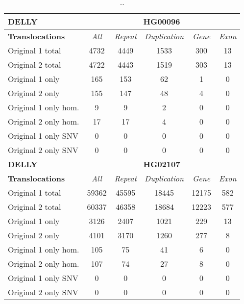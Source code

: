 \begin{table}[htb]
\begin{center}
\begin{tabular}{|l|c||c|c|c|c|}
\hline
{\bf DELLY} & \multicolumn{5}{|c|}{\bf HG00096} \\
\hline
\cline{2-6}
{\bf Translocations} & {\it All} & {\it Repeat} & {\it Duplication} & {\it Gene} & {\it Exon} \\
\hline
Original 1 total & 4732 & 4449 & 1533 & 300 & 13\\ 
\hline
Original 2 total & 4722 & 4443 & 1519 & 303 & 13\\ 
\hline
Original 1 only & 165 & 153 & 62 & 1 & 0\\ 
\hline
Original 2 only & 155 & 147 & 48 & 4 & 0\\ 
\hline
Original 1 only hom. & 9 & 9 & 2 & 0 & 0\\ 
\hline
Original 2 only hom. & 17 & 17 & 4 & 0 & 0\\ 
\hline
Original 1 only SNV & 0 & 0 & 0 & 0 & 0\\ 
\hline
Original 2 only SNV & 0 & 0 & 0 & 0 & 0\\ 
\hline
\hline
{\bf DELLY} & \multicolumn{5}{|c|}{\bf HG02107} \\
\hline
\cline{2-6}
{\bf Translocations} & {\it All} & {\it Repeat} & {\it Duplication} & {\it Gene} & {\it Exon} \\
\hline
Original 1 total & 59362 & 45595 & 18445 & 12175 & 582\\ 
\hline
Original 2 total & 60337 & 46358 & 18684 & 12223 & 577\\ 
\hline
Original 1 only & 3126 & 2407 & 1021 & 229 & 13\\ 
\hline
Original 2 only & 4101 & 3170 & 1260 & 277 & 8\\ 
\hline
Original 1 only hom. & 105 & 75 & 41 & 6 & 0\\ 
\hline
Original 2 only hom. & 107 & 74 & 27 & 8 & 0\\ 
\hline
Original 1 only SNV & 0 & 0 & 0 & 0 & 0\\ 
\hline
Original 2 only SNV & 0 & 0 & 0 & 0 & 0\\ 
\hline
\end{tabular}
\end{center}
\caption{ .. }
\label{tab:orig-vs-shuf-delly-trans}
\end{table}
